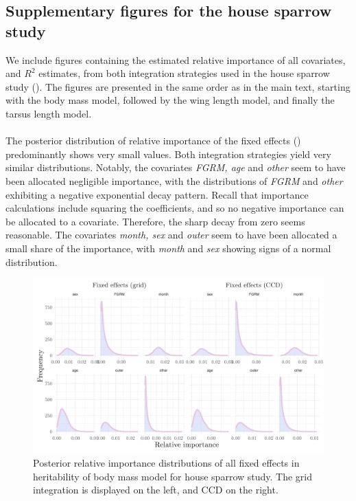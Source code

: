 \subsection*{Supplementary figures for the house sparrow study}
\label{sec:supplementary_sparrows}

We include figures containing the estimated relative importance of all covariates, and $R^2$ estimates, from both integration strategies used in the house sparrow study (). The figures are presented in the same order as in the main text, starting with the body mass model, followed by the wing length model, and finally the tarsus length model.
\\
\\
The posterior distribution of relative importance of the fixed effects () predominantly shows very small values. Both integration strategies yield very similar distributions. Notably, the covariates \textit{FGRM, age} and \textit{other} seem to have been allocated negligible importance, with the distributions of \textit{FGRM} and \textit{other} exhibiting a negative exponential decay pattern. Recall that importance calculations include squaring the coefficients, and so no negative importance can be allocated to a covariate. Therefore, the sharp decay from zero seems reasonable. The covariates \textit{month, sex} and \textit{outer} seem to have been allocated a small share of the importance, with \textit{month} and \textit{sex} showing signs of a normal distribution.
\begin{figure}[H]%
  \centering
  \includegraphics[width=1\linewidth]{Figures/House sparrow study/Mass_fixed.png}
  \caption[Posterior relative importance distributions of all fixed effects in body mass model for house sparrow study]{Posterior relative importance distributions of all fixed effects in heritability of body mass model for house sparrow study. The grid integration is displayed on the left, and CCD on the right.}
  \label{fig:mass_fixed_sparrows}
\end{figure}


